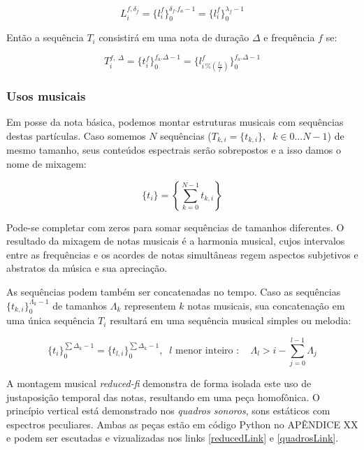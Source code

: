 \begin{equation}\label{periodoUnico}
L_i^{f , \delta_f } = \{ l_i^f \}_0^{\delta_f . f_a -1}=\{ l_i^f \}_0^{\lambda_f-1}
\end{equation}

Então a sequência $T_i$ consistirá em uma nota de duração $\Delta$ e frequência $f$ se:

\begin{equation}
T_i^{f,\; \Delta}=\{t_i^f\}_0^{f_a . \Delta-1}=\{l^f_{i\,\%\left(\frac{f_a}{f}\right)}\}_0^{f_a . \Delta-1}
\end{equation}


\subsubsection{Usos musicais}

Em posse da nota básica, podemos montar estruturas musicais com
sequências destas partículas. Caso somemos $N$ sequências ($T_{k,i}=\{t_{k,i}\}, \;\; k \in 0...N-1$) de mesmo tamanho, seus conteúdos espectrais serão sobrepostos e a isso damos o nome de mixagem:

\begin{equation}\label{ex:mixagem}
\{t_i\}=\left \{ \sum_{k=0}^{N-1}t_{k,i} \right \}
\end{equation}

Pode-se completar com zeros para somar sequências de tamanhos diferentes. O resultado da mixagem de notas musicais é a harmonia musical, cujos intervalos entre as frequências e os acordes de notas simultâneas regem aspectos subjetivos e abstratos da música e sua apreciação.

As sequências podem também ser concatenadas no tempo. Caso as sequências $\{t_{k,i}\}_0^{\Lambda_k-1}$ de tamanhos $\Lambda_k$  representem $k$ notas musicais, sua concatenação em uma única sequência $T_i$ resultará em uma sequência musical simples ou melodia:

\begin{equation}
\{t_i\}_0^{\sum\Delta_k-1}=\{t_{l,i}\}_0^{\sum\Delta_k-1}, \;\; l\text{ menor inteiro } : \quad \Lambda_l > i -\sum_{j=0}^{l-1}\Lambda_j
\end{equation}

A montagem musical \emph{reduced-fi} demonstra de forma isolada este uso de justaposição temporal das notas, resultando em uma peça homofônica. O princípio vertical está demonstrado nos \emph{quadros sonoros}, sons estáticos com espectros peculiares. Ambas as peças estão em código Python no APÊNDICE XX e podem ser escutadas e vizualizadas nos links \ref{reducedLink} e \ref{quadrosLink}.

